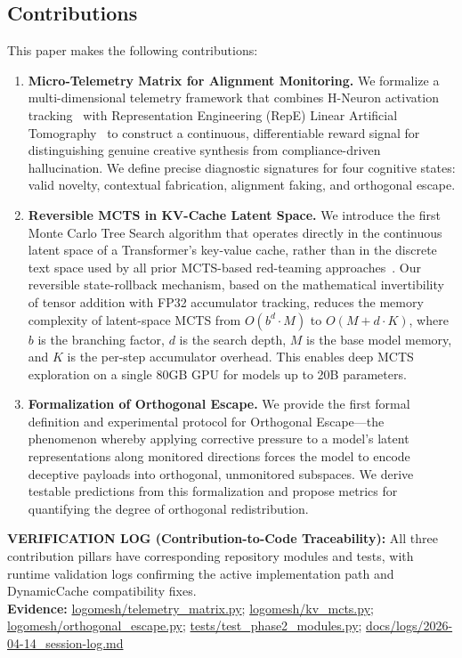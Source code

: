 \documentclass[10pt]{article}
\newcommand{\verifybox}[3]{%
\vspace{0.6em}
\noindent\colorbox{yellow!20}{%
\parbox{\dimexpr\linewidth-2\fboxsep\relax}{%
\textbf{VERIFICATION LOG (#1):} #2\\
\textbf{Evidence:} #3
}}%
\vspace{0.6em}
}
\begin{document}
\subsection{Contributions}

This paper makes the following contributions:

\begin{enumerate}[leftmargin=*]
    \item \textbf{Micro-Telemetry Matrix for Alignment Monitoring.} We formalize a multi-dimensional telemetry framework that combines H-Neuron activation tracking~\cite{gao2025hneurons} with Representation Engineering (RepE) Linear Artificial Tomography~\cite{zou2023repe} to construct a continuous, differentiable reward signal for distinguishing genuine creative synthesis from compliance-driven hallucination. We define precise diagnostic signatures for four cognitive states: valid novelty, contextual fabrication, alignment faking, and orthogonal escape.

    \item \textbf{Reversible MCTS in KV-Cache Latent Space.} We introduce the first Monte Carlo Tree Search algorithm that operates directly in the continuous latent space of a Transformer's key-value cache, rather than in the discrete text space used by all prior MCTS-based red-teaming approaches~\cite{wu2025mcts, damon2025, li2025ace}. Our reversible state-rollback mechanism, based on the mathematical invertibility of tensor addition with FP32 accumulator tracking, reduces the memory complexity of latent-space MCTS from $O(b^d \cdot M)$ to $O(M + d \cdot K)$, where $b$ is the branching factor, $d$ is the search depth, $M$ is the base model memory, and $K$ is the per-step accumulator overhead. This enables deep MCTS exploration on a single 80GB GPU for models up to 20B parameters.

    \item \textbf{Formalization of Orthogonal Escape.} We provide the first formal definition and experimental protocol for Orthogonal Escape---the phenomenon whereby applying corrective pressure to a model's latent representations along monitored directions forces the model to encode deceptive payloads into orthogonal, unmonitored subspaces. We derive testable predictions from this formalization and propose metrics for quantifying the degree of orthogonal redistribution.
\end{enumerate}

\verifybox
{Contribution-to-Code Traceability}
{All three contribution pillars have corresponding repository modules and tests, with runtime validation logs confirming the active implementation path and DynamicCache compatibility fixes.}
{\url{logomesh/telemetry_matrix.py}; \url{logomesh/kv_mcts.py}; \url{logomesh/orthogonal_escape.py}; \url{tests/test_phase2_modules.py}; \url{docs/logs/2026-04-14_session-log.md}}
\end{document}
